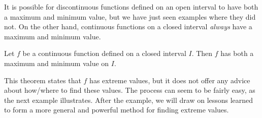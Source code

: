  
 It is possible for discontinuous functions defined on an open interval to have both a maximum and minimum value, but we have just seen examples where they did not. On the other hand, continuous functions on a closed interval \textit{always} have a maximum and minimum value.
 
%
{Let $f$ be a continuous function defined on a closed interval $I$. Then $f$ has both a maximum and minimum value on $I$.
}

This theorem states that $f$ has extreme values, but it does not offer any advice about how/where to find these values. The process can seem to be fairly easy, as the next example illustrates. After the example, we will draw on lessons learned to form a more general and powerful method for finding extreme values.\\

